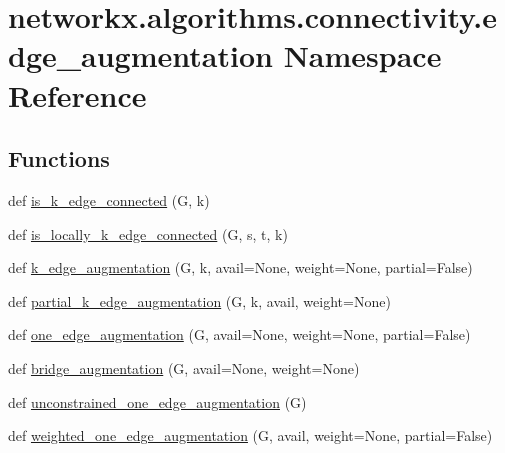 \hypertarget{namespacenetworkx_1_1algorithms_1_1connectivity_1_1edge__augmentation}{}\section{networkx.\+algorithms.\+connectivity.\+edge\+\_\+augmentation Namespace Reference}
\label{namespacenetworkx_1_1algorithms_1_1connectivity_1_1edge__augmentation}
\subsection*{Functions}
\begin{DoxyCompactItemize}
\item 
def \hyperlink{namespacenetworkx_1_1algorithms_1_1connectivity_1_1edge__augmentation_a9edaf25287039801db3e652e682b99fa}{is\+\_\+k\+\_\+edge\+\_\+connected} (G, k)
\item 
def \hyperlink{namespacenetworkx_1_1algorithms_1_1connectivity_1_1edge__augmentation_a0f587abc03abd9c47c5a343e89138e52}{is\+\_\+locally\+\_\+k\+\_\+edge\+\_\+connected} (G, s, t, k)
\item 
def \hyperlink{namespacenetworkx_1_1algorithms_1_1connectivity_1_1edge__augmentation_aa5ba4f94f43fea04c2dd588220e0ecf6}{k\+\_\+edge\+\_\+augmentation} (G, k, avail=None, weight=None, partial=False)
\item 
def \hyperlink{namespacenetworkx_1_1algorithms_1_1connectivity_1_1edge__augmentation_a6deef4add1e5a47502471839bea102db}{partial\+\_\+k\+\_\+edge\+\_\+augmentation} (G, k, avail, weight=None)
\item 
def \hyperlink{namespacenetworkx_1_1algorithms_1_1connectivity_1_1edge__augmentation_af69ca38acad2ed6863fbd62a80f668d1}{one\+\_\+edge\+\_\+augmentation} (G, avail=None, weight=None, partial=False)
\item 
def \hyperlink{namespacenetworkx_1_1algorithms_1_1connectivity_1_1edge__augmentation_af6a870b7732e689c169dcf176293462f}{bridge\+\_\+augmentation} (G, avail=None, weight=None)
\item 
def \hyperlink{namespacenetworkx_1_1algorithms_1_1connectivity_1_1edge__augmentation_a44c3e5532da2c932a9fa55165ebf103d}{unconstrained\+\_\+one\+\_\+edge\+\_\+augmentation} (G)
\item 
def \hyperlink{namespacenetworkx_1_1algorithms_1_1connectivity_1_1edge__augmentation_a2c1f6911ffedbdeb793f0a79f976b96c}{weighted\+\_\+one\+\_\+edge\+\_\+augmentation} (G, avail, weight=None, partial=False)

\end{DoxyCompactItemize}
